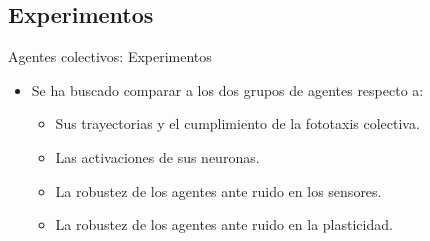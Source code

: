 \documentclass[aspectratio=169]{beamer}
\begin{document}
\subsection{Experimentos}
\begin{frame}{Agentes colectivos: Experimentos}
\begin{itemize}
  \item Se ha buscado comparar a los dos grupos de agentes respecto a:
  \begin{itemize}
    \item Sus trayectorias y el cumplimiento de la fototaxis colectiva.
    \item Las activaciones de sus neuronas.
    \item La robustez de los agentes ante ruido en los sensores.
    \item La robustez de los agentes ante ruido en la plasticidad.
  \end{itemize}
\end{itemize}
\end{frame}
\end{document}
